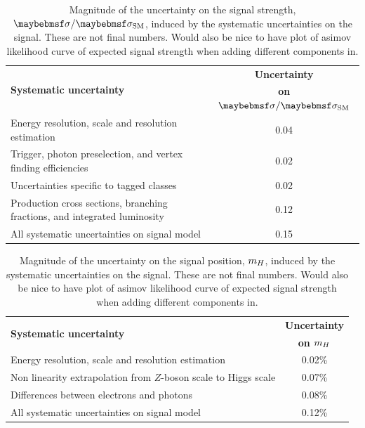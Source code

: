 \begin{table}[htbp]
\caption{Magnitude of the uncertainty on the signal strength, $\musm$, induced by the systematic uncertainties on the signal. These are not final numbers. Would also be nice to have plot of asimov likelihood curve of expected signal strength when adding different components in.}
\begin{center}
\begin{tabular}{ l c }
\hline
\multirow{2}{*}{\textbf{Systematic uncertainty}} & \textbf{Uncertainty} \\
 &  \textbf{on $\musm$} \\
\hline
\hline
Energy resolution, scale and resolution estimation & 0.04\\
\hline
Trigger, photon preselection, and vertex finding efficiencies& 0.02\\
\hline
Uncertainties specific to tagged classes & 0.02\\
\hline
Production cross sections, branching fractions, and integrated luminosity & 0.12\\
\hline
\hline
All systematic uncertainties on signal model & 0.15 \\
\hline
\end{tabular}
\end{center}
\label{tab:systematics_mu}
\end{table}

\begin{table}[htbp]
\caption{Magnitude of the uncertainty on the signal position, $m_{H}$, induced by the systematic uncertainties on the signal. These are not final numbers. Would also be nice to have plot of asimov likelihood curve of expected signal strength when adding different components in.}
\begin{center}
\begin{tabular}{ l c }
\hline
\multirow{2}{*}{\textbf{Systematic uncertainty}} & \textbf{Uncertainty} \\
 &  \textbf{on $m_{H}$} \\
\hline
\hline
Energy resolution, scale and resolution estimation & 0.02\% \\
\hline
Non linearity extrapolation from $Z$-boson scale to Higgs scale & 0.07\% \\
\hline
Differences between electrons and photons & 0.08\% \\
\hline
\hline
All systematic uncertainties on signal model & 0.12\% \\
\hline
\end{tabular}
\end{center}
\label{tab:systematics_mh}
\end{table}

